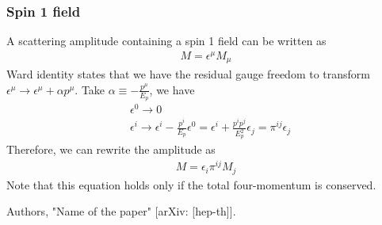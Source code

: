 \documentclass[11pt,a4paper]{article}
\newcommand{\ie}{\begin{equation}\begin{aligned}}
\newcommand{\fe}{\end{aligned}\end{equation}}
\begin{document}
\subsubsection{Spin 1 field}
A scattering amplitude containing a spin 1 field can be written as 
\ie
M = \epsilon^\mu M_\mu
\fe
Ward identity states that we have the residual gauge freedom to transform $\epsilon^\mu \rightarrow \epsilon^\mu + \alpha p^\mu$. Take $\alpha \equiv -\frac{p^\mu}{E_p}$, we have
\ie
&\epsilon^0 \rightarrow 0
\\
&\epsilon^i \rightarrow \epsilon^i - \frac{p^i}{E_p}\epsilon^0 = \epsilon^i + \frac{p^i p^j}{E_p^2}\epsilon_j = \pi^{ij} \epsilon_j
\fe
Therefore, we can rewrite the amplitude as
\ie
\label{eqn: spin 1 amplitude written in pi_ij}
M = \epsilon_i \pi^{ij} M_j
\fe
Note that this equation holds only if the total four-momentum is conserved.






\begin{thebibliography}{99}


Authors,
"Name of the paper"
[arXiv: [hep-th]].


\end{thebibliography}
\end{document}
